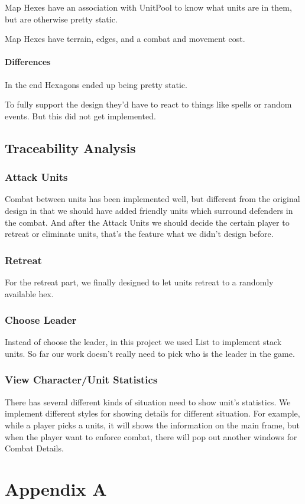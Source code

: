 \documentclass[12pt,a4paper,titlepage]{article}
\begin{document}
Map Hexes have an association with UnitPool to know what units
are in them, but are otherwise pretty static.

Map Hexes have terrain, edges, and a combat and movement cost.
\paragraph{Differences}
In the end Hexagons ended up being pretty static.

To fully support the design they'd have to
react to things like spells or random events.
But this did not get implemented.

\subsection{Traceability Analysis}
\subsubsection{Attack Units} Combat between units has been implemented 
well, but different from the original design in that we should have
added friendly units which surround defenders in the combat. And 
after the Attack Units we should decide the certain player to retreat or 
eliminate units, that's the feature what we didn't design before.
\subsubsection{Retreat} For the retreat part, we finally designed to let 
units retreat to a randomly available hex.
\subsubsection{Choose Leader} Instead of choose the leader, in this 
project we used List to implement stack units. So far our work doesn't 
really need to pick who is the leader in the game.
\subsubsection{View Character/Unit Statistics} There has several 
different kinds of situation need to show unit's statistics. We 
implement different styles for showing details for different situation. 
For example, while a player picks a units, it will shows the information 
on the main frame, but when the player want to enforce combat, there 
will pop out another windows for Combat Details.

\section{Appendix A}
\end{document}
